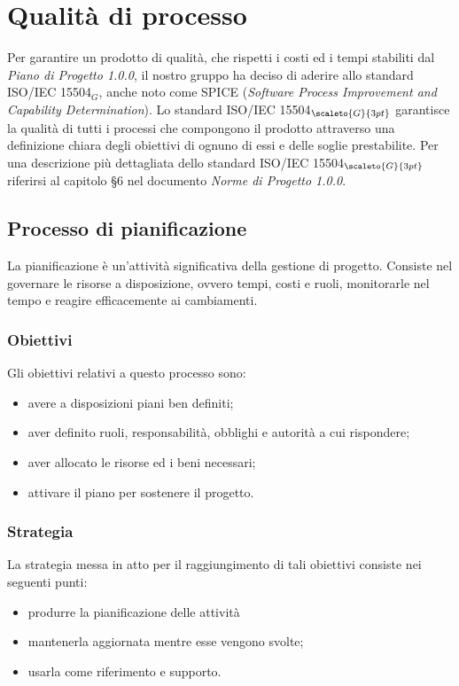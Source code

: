 \chapter{Qualità di processo}\label{QualitàDelProcesso}
Per garantire un prodotto di qualità, che rispetti i costi ed i tempi stabiliti dal \textit{Piano di Progetto 1.0.0}, il nostro gruppo ha deciso di aderire allo standard ISO/IEC 15504$_G$, anche noto come SPICE (\textit{Software Process Improvement and Capability Determination}).
Lo standard ISO/IEC 15504$_{\scaleto{G}{3pt}}$ garantisce la qualità di tutti i processi che compongono il prodotto attraverso una definizione chiara degli obiettivi di ognuno di essi e delle soglie prestabilite. 
Per una descrizione più dettagliata dello standard ISO/IEC 15504$_{\scaleto{G}{3pt}}$
riferirsi al capitolo §6 nel documento \textit{Norme di Progetto 1.0.0}.
\section{Processo di pianificazione}\label{QualitàDelProcessoProcessoDiPianificazione}
La pianificazione è un’attività significativa della gestione di progetto. 
Consiste nel governare le risorse a disposizione, ovvero tempi, costi e ruoli, monitorarle nel tempo e reagire efficacemente ai cambiamenti. 

\subsection{Obiettivi}\label{QualitàDelProcessoProcessoDiPianificazioneObiettivi}
Gli obiettivi relativi a questo processo sono:
\begin{itemize}
	\item avere a disposizioni piani ben definiti;
	\item aver definito ruoli, responsabilità, obblighi e autorità a cui rispondere;
	\item aver allocato le risorse ed i beni necessari;
	\item attivare il piano per sostenere il progetto.
\end{itemize}

\subsection{Strategia}\label{QualitàDelProcessoProcessoDiPianificazioneStrategia}
La strategia messa in atto per il raggiungimento di tali obiettivi consiste nei seguenti punti:
\begin{itemize}
	\item produrre la pianificazione delle attività
	\item mantenerla aggiornata mentre esse vengono svolte;
	\item usarla come riferimento e supporto.
\end{itemize}

